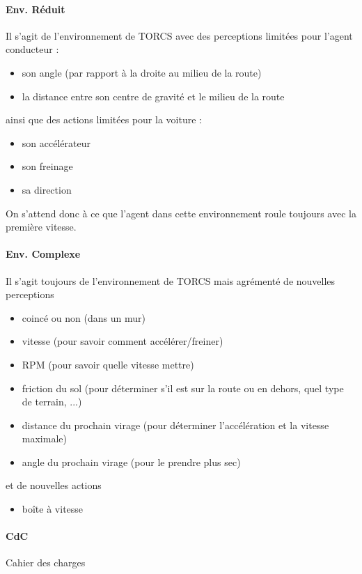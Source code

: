 \documentclass[a4paper,12pt]{article}
\begin{document}
  \paragraph{Env. Réduit} Il s'agit de l'environnement de TORCS avec des perceptions limitées pour l'agent conducteur :
    \begin{itemize}
     \item son angle (par rapport à la droite au milieu de la route)
     \item la distance entre son centre de gravité et le milieu de la route
     \end{itemize}
     ainsi que des actions limitées pour la voiture :
    \begin{itemize}
    \item son accélérateur
    \item son freinage
    \item sa direction
    \end{itemize}
    On s'attend donc à ce que l'agent dans cette environnement roule toujours avec la première vitesse.
  
  \paragraph{Env. Complexe}Il s'agit toujours de l'environnement de TORCS mais agrémenté de nouvelles perceptions
    \begin{itemize}
     \item coincé ou non (dans un mur)
     \item vitesse (pour savoir comment accélérer/freiner)
     \item RPM (pour savoir quelle vitesse mettre)
     \item friction du sol (pour déterminer s'il est sur la route ou en dehors, quel type de terrain, ...)
     \item distance du prochain virage (pour déterminer l'accélération et la vitesse maximale)
     \item angle du prochain virage (pour le prendre plus sec)
    \end{itemize}
    et de nouvelles actions
    \begin{itemize}
     \item boîte à vitesse
    \end{itemize}
    
   \paragraph{CdC} Cahier des charges
   
\end{document}
